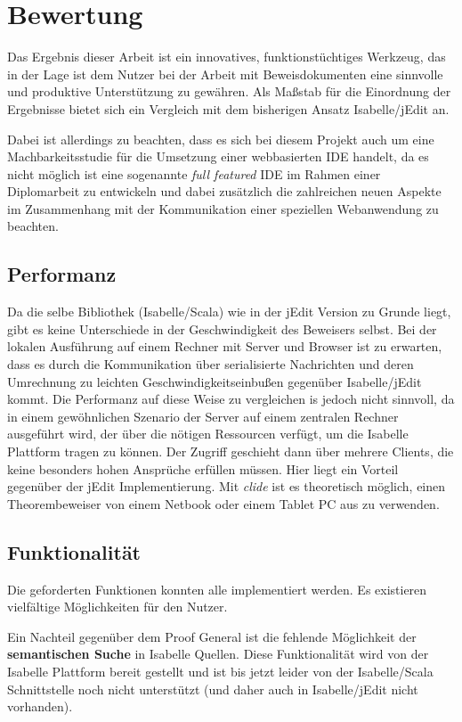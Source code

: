 \chapter{Bewertung}

Das Ergebnis dieser Arbeit ist ein innovatives, funktionstüchtiges Werkzeug, das in der Lage ist dem
Nutzer bei der Arbeit mit Beweisdokumenten eine sinnvolle und produktive Unterstützung zu gewähren.
Als Maßstab für die Einordnung der Ergebnisse bietet sich ein Vergleich mit dem bisherigen Ansatz
Isabelle/jEdit an. 

Dabei ist allerdings zu beachten, dass es sich bei diesem Projekt auch um eine Machbarkeitsstudie
für die Umsetzung einer webbasierten IDE handelt, da es nicht möglich ist eine sogenannte
\textit{full featured} IDE im Rahmen einer Diplomarbeit zu entwickeln und dabei zusätzlich die
zahlreichen neuen Aspekte im Zusammenhang mit der Kommunikation einer speziellen Webanwendung zu
beachten.

\section{Performanz}

Da die selbe Bibliothek (Isabelle/Scala) wie in der jEdit Version zu Grunde liegt, gibt es keine
Unterschiede in der Geschwindigkeit des Beweisers selbst. Bei der lokalen Ausführung auf einem
Rechner mit Server und Browser ist zu erwarten, dass es durch die Kommunikation über serialisierte
Nachrichten und deren Umrechnung zu leichten Geschwindigkeitseinbußen gegenüber Isabelle/jEdit
kommt. Die Performanz auf diese Weise zu vergleichen is jedoch nicht sinnvoll, da in einem
gewöhnlichen Szenario der Server auf einem zentralen Rechner ausgeführt wird, der über die nötigen
Ressourcen verfügt, um die Isabelle Plattform tragen zu können. Der Zugriff geschieht dann über
mehrere Clients, die keine besonders hohen Ansprüche erfüllen müssen. Hier liegt ein Vorteil
gegenüber der jEdit Implementierung. Mit \textit{clide} ist es theoretisch möglich, einen
Theorembeweiser von einem Netbook oder einem Tablet PC aus zu verwenden.

\section{Funktionalität}

Die geforderten Funktionen konnten alle implementiert werden. Es existieren vielfältige
Möglichkeiten für den Nutzer.

Ein Nachteil gegenüber dem Proof General ist die fehlende Möglichkeit der \textbf{semantischen
Suche} in Isabelle Quellen. Diese Funktionalität wird von der Isabelle Plattform bereit gestellt und
ist bis jetzt leider von der Isabelle/Scala Schnittstelle noch nicht unterstützt (und daher auch in
Isabelle/jEdit nicht vorhanden).

